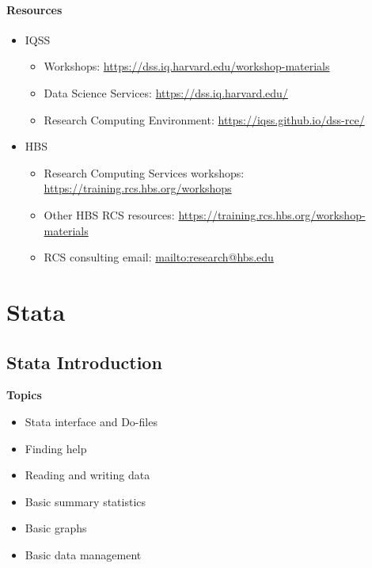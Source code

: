 \documentclass[]{book}
\providecommand{\tightlist}{%
  \setlength{\itemsep}{0pt}\setlength{\parskip}{0pt}}
\begin{document}
\hypertarget{resources-6}{%
\subsection{Resources}\label{resources-6}}

\begin{itemize}
\tightlist
\item
  IQSS

  \begin{itemize}
  \tightlist
  \item
    Workshops: \url{https://dss.iq.harvard.edu/workshop-materials}
  \item
    Data Science Services: \url{https://dss.iq.harvard.edu/}
  \item
    Research Computing Environment: \url{https://iqss.github.io/dss-rce/}
  \end{itemize}
\item
  HBS

  \begin{itemize}
  \tightlist
  \item
    Research Computing Services workshops: \url{https://training.rcs.hbs.org/workshops}
  \item
    Other HBS RCS resources: \url{https://training.rcs.hbs.org/workshop-materials}
  \item
    RCS consulting email: \url{mailto:research@hbs.edu}
  \end{itemize}
\end{itemize}

\hypertarget{part-stata}{%
\part{Stata}\label{part-stata}}

\hypertarget{stata-introduction}{%
\chapter{Stata Introduction}\label{stata-introduction}}

\textbf{Topics}

\begin{itemize}
\tightlist
\item
  Stata interface and Do-files
\item
  Finding help
\item
  Reading and writing data
\item
  Basic summary statistics
\item
  Basic graphs
\item
  Basic data management
\end{itemize}
\end{document}
